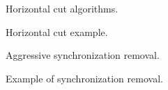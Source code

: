   \clearpage
  \begin{figure}[t]
    \caption{Horizontal cut algorithms.
    \protect\label{code:horiz}}
  \end{figure}
  \begin{figure}[t]
    \caption{Horizontal cut example.
      \protect\label{ex:horiz}}
  \end{figure}
  
  \clearpage
  \begin{figure}[t]
    \caption{Aggressive synchronization removal.
    \protect\label{code:syc}}
  \end{figure}
  \begin{figure}[t]
    \caption{Example of synchronization removal.
    \protect\label{ex:sync}}
  \end{figure}

